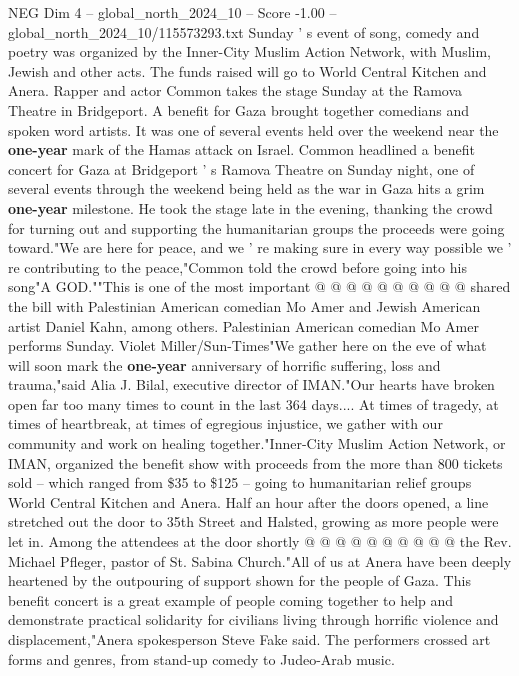 \begin{textsample}{NEG Dim 4 – global\_north\_2024\_10 – Score -1.00 – global\_north\_2024\_10/115573293.txt}  \label{ex:f4_neg_058}
Sunday ' s event of song, comedy and poetry was organized by the Inner-City Muslim Action Network, with Muslim, Jewish and other acts.
The funds raised will go to World Central Kitchen and Anera.
Rapper and actor Common takes the stage Sunday at the Ramova Theatre in Bridgeport.
A benefit for Gaza brought together comedians and spoken word artists.
It was one of several events held over the weekend near the \textbf{one-year} mark of the Hamas attack on Israel.
Common headlined a benefit concert for Gaza at Bridgeport ' s Ramova Theatre on Sunday night, one of several events through the weekend being held as the war in Gaza hits a grim \textbf{one-year} milestone.
He took the stage late in the evening, thanking the crowd for turning out and supporting the humanitarian groups the proceeds were going toward."We are here for peace, and we ' re making sure in every way possible we ' re contributing to the peace,"Common told the crowd before going into his song"A GOD.""This is one of the most important @ @ @ @ @ @ @ @ @ @ shared the bill with Palestinian American comedian Mo Amer and Jewish American artist Daniel Kahn, among others.
Palestinian American comedian Mo Amer performs Sunday.
Violet Miller/Sun-Times"We gather here on the eve of what will soon mark the \textbf{one-year} anniversary of horrific suffering, loss and trauma,"said Alia J.
Bilal, executive director of IMAN."Our hearts have broken open far too many times to count in the last 364 days....
At times of tragedy, at times of heartbreak, at times of egregious injustice, we gather with our community and work on healing together."Inner-City Muslim Action Network, or IMAN, organized the benefit show with proceeds from the more than 800 tickets sold -- which ranged from \$35 to \$125 -- going to humanitarian relief groups World Central Kitchen and Anera.
Half an hour after the doors opened, a line stretched out the door to 35th Street and Halsted, growing as more people were let in.
Among the attendees at the door shortly @ @ @ @ @ @ @ @ @ @ the Rev.
Michael Pfleger, pastor of St.
Sabina Church."All of us at Anera have been deeply heartened by the outpouring of support shown for the people of Gaza.
This benefit concert is a great example of people coming together to help and demonstrate practical solidarity for civilians living through horrific violence and displacement,"Anera spokesperson Steve Fake said.
The performers crossed art forms and genres, from stand-up comedy to Judeo-Arab music.

\end{textsample}
